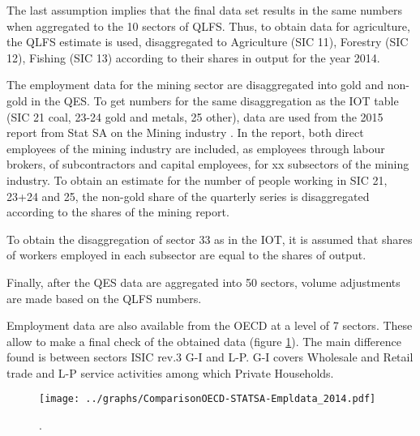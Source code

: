 \documentclass[12pt,english]{article}
\newcommand\lies[2][]{\todo[color=orange!50,#1]{ldf: #2}}
\begin{document}
The last assumption implies that the final data set results in the same numbers when aggregated to the 10 sectors of QLFS. Thus, to obtain data for agriculture, the QLFS estimate is used, disaggregated to Agriculture (SIC 11), Forestry (SIC 12), Fishing (SIC 13) according to their shares in output for the year 2014. 

The employment data for the mining sector are disaggregated into gold and non-gold in the QES. To get numbers for the same disaggregation as the IOT table (SIC 21 coal, 23-24 gold and metals, 25 other), data are used from the 2015 report from Stat SA on the Mining industry \citep{mining2015}. In the report, both direct employees of the mining industry are included, as employees through labour brokers, of subcontractors and capital employees\lies{what are those?}, for xx subsectors of the mining industry. %
To obtain an estimate for the number of people working in SIC 21, 23+24 and 25, the non-gold share of the quarterly series is disaggregated according to the shares of the mining report. 

To obtain the disaggregation of sector 33 as in the IOT, it is assumed that shares of workers employed in each subsector are equal to the shares of output.

Finally, after the QES data are aggregated into 50 sectors, volume adjustments are made based on the QLFS numbers.


Employment data are also available from the OECD at a level of 7 sectors. These allow to make a final check of the obtained data (figure \ref{ComparisonOECD-STATSA-Empldata_2014}). The main difference found is between sectors ISIC rev.3 G-I and L-P. G-I covers Wholesale and Retail trade and L-P service activities among which Private Households. 

\begin{figure}[!h]
	\centering
	\texttt{[image: ../graphs/ComparisonOECD-STATSA-Empldata\_2014.pdf]}
	\caption{\label{ComparisonOECD-STATSA-Empldata_2014}.}
\end{figure}
\end{document}

